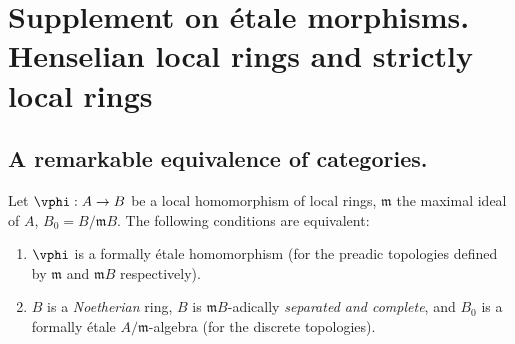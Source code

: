 \section{Supplement on \'etale morphisms. Henselian local rings and strictly local rings}
\label{section:IV.18}

\subsection{A remarkable equivalence of categories.}
\label{subsection:IV.18.1}

\begin{theorem}[18.1.1]
\label{IV.18.1.1}
Let $\vphi:A\to B$ be a local homomorphism of local rings, $\mathfrak{m}$ the maximal ideal of $A$, $B_0=B/\mathfrak{m}B$.
The following conditions are equivalent:
\begin{enumerate}[label=\emph{\alph*)}]
  \item $\vphi$ is a formally \'etale homomorphism (for the preadic topologies defined by $\mathfrak{m}$ and $\mathfrak{m}B$ respectively).
  \item $B$ is a \emph{Noetherian} ring, $B$ is $\mathfrak{m}B$-adically \emph{separated and complete}, and $B_0$ is a formally \'etale $A/\mathfrak{m}$-algebra (for the discrete topologies).
\end{enumerate}
\end{theorem}

